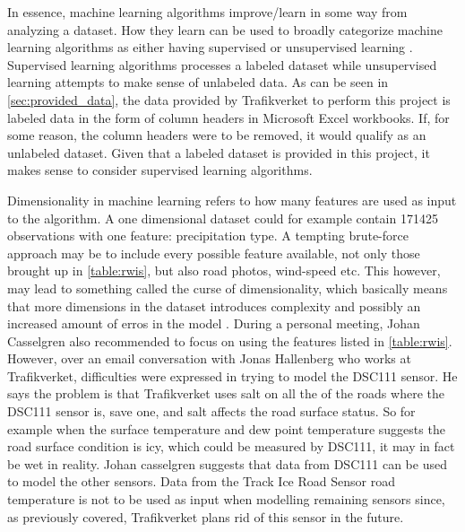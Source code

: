 	In essence, machine learning algorithms improve/learn in some way from analyzing a dataset. How they learn can be used to broadly categorize machine learning algorithms as either having supervised or unsupervised learning \cite{BOOK:1}. Supervised learning algorithms processes a labeled dataset while unsupervised learning attempts to make sense of unlabeled data. As can be seen in \ref{sec:provided_data}, the data provided by Trafikverket to perform this project is labeled data in the form of column headers in Microsoft Excel workbooks.  If, for some reason, the column headers were to be removed, it would qualify as an unlabeled dataset. Given that a labeled dataset is provided in this project, it makes sense to consider supervised learning algorithms.

	Dimensionality in machine learning refers to how many features are used as input to the algorithm. A one dimensional dataset could for example contain 171425 observations with one feature: precipitation type. A tempting brute-force approach may be to include every possible feature available, not only those brought up in \ref{table:rwis}, but also road photos, wind-speed etc. This however, may lead to something called the curse of dimensionality, which basically means that more dimensions in the dataset introduces complexity and possibly an increased amount of erros in the model \cite{BOOK:6}. During a personal meeting, Johan Casselgren also recommended to focus on using the features listed in \ref{table:rwis}. However, over an email conversation with Jonas Hallenberg who works at Trafikverket, difficulties were expressed in trying to model the DSC111 sensor. He says the problem is that Trafikverket uses salt on all the of the roads where the DSC111 sensor is, save one, and salt affects the road surface status. So for example when the surface temperature and dew point temperature suggests the road surface condition is icy, which could be measured by DSC111, it may in fact be wet in reality. Johan casselgren suggests that data from DSC111 can be used to model the other sensors. Data from the Track Ice Road Sensor road temperature is not to be used as input when modelling remaining sensors since, as previously covered, Trafikverket plans rid of this sensor in the future. 
	
